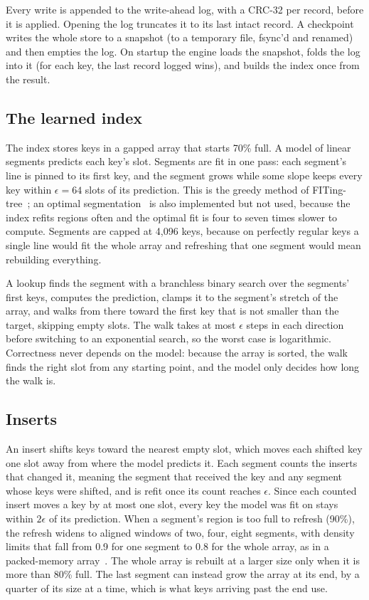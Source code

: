 \documentclass[conference]{IEEEtran}
\begin{document}
Every write is appended to the write-ahead log, with a CRC-32 per record,
before it is applied. Opening the log truncates it to its last intact
record. A checkpoint writes the whole store to a snapshot (to a temporary
file, fsync'd and renamed) and then empties the log. On startup the engine
loads the snapshot, folds the log into it (for each key, the last record
logged wins), and builds the index once from the result.

\subsection{The learned index}

The index stores keys in a gapped array that starts 70\% full. A model of
linear segments predicts each key's slot. Segments are fit in one pass:
each segment's line is pinned to its first key, and the segment grows while
some slope keeps every key within $\epsilon = 64$ slots of its prediction.
This is the greedy method of FITing-tree~\cite{galakatos2019}; an optimal
segmentation~\cite{orourke1981,ferragina2020} is also implemented but not
used, because the index refits regions often and the optimal fit is four to
seven times slower to compute. Segments are capped at 4,096 keys, because on
perfectly regular keys a single line would fit the whole array and
refreshing that one segment would mean rebuilding everything.

A lookup finds the segment with a branchless binary search over the
segments' first keys, computes the prediction, clamps it to the segment's
stretch of the array, and walks from there toward the first key that is not
smaller than the target, skipping empty slots. The walk takes at most
$\epsilon$ steps in each direction before switching to an exponential
search, so the worst case is logarithmic. Correctness never depends on the
model: because the array is sorted, the walk finds the right slot from any
starting point, and the model only decides how long the walk is.

\subsection{Inserts}

An insert shifts keys toward the nearest empty slot, which moves each
shifted key one slot away from where the model predicts it. Each segment
counts the inserts that changed it, meaning the segment that received the
key and any segment whose keys were shifted, and is refit once its count
reaches $\epsilon$. Since each counted insert moves a key by at most one
slot, every key the model was fit on stays within $2\epsilon$ of its
prediction. When a segment's region is too full to refresh (90\%), the
refresh widens to aligned windows of two, four, eight segments, with
density limits that fall from 0.9 for one segment to 0.8 for the whole
array, as in a packed-memory array~\cite{itai1981,bender2000}. The whole array
is rebuilt at a larger size only when it is more than 80\% full. The last segment can instead grow
the array at its end, by a quarter of its size at a time, which is what
keys arriving past the end use.
\end{document}
